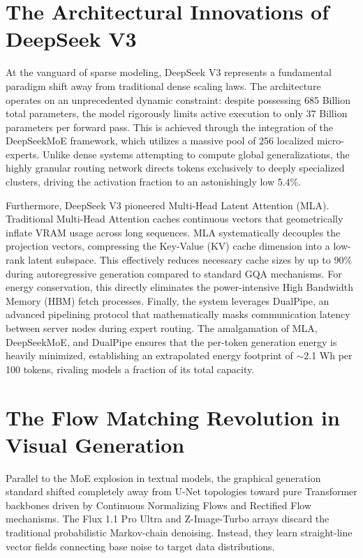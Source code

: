 \documentclass[12pt, a4paper]{report}
\begin{document}
\section{The Architectural Innovations of DeepSeek V3}
At the vanguard of sparse modeling, DeepSeek V3 represents a fundamental paradigm shift away from traditional dense scaling laws. The architecture operates on an unprecedented dynamic constraint: despite possessing 685 Billion total parameters, the model rigorously limits active execution to only 37 Billion parameters per forward pass. This is achieved through the integration of the DeepSeekMoE framework, which utilizes a massive pool of 256 localized micro-experts. Unlike dense systems attempting to compute global generalizations, the highly granular routing network directs tokens exclusively to deeply specialized clusters, driving the activation fraction to an astonishingly low 5.4\%.

Furthermore, DeepSeek V3 pioneered Multi-Head Latent Attention (MLA). Traditional Multi-Head Attention caches continuous vectors that geometrically inflate VRAM usage across long sequences. MLA systematically decouples the projection vectors, compressing the Key-Value (KV) cache dimension into a low-rank latent subspace. This effectively reduces necessary cache sizes by up to 90\% during autoregressive generation compared to standard GQA mechanisms. For energy conservation, this directly eliminates the power-intensive High Bandwidth Memory (HBM) fetch processes. Finally, the system leverages DualPipe, an advanced pipelining protocol that mathematically masks communication latency between server nodes during expert routing. The amalgamation of MLA, DeepSeekMoE, and DualPipe ensures that the per-token generation energy is heavily minimized, establishing an extrapolated energy footprint of $\sim$2.1 Wh per 100 tokens, rivaling models a fraction of its total capacity.

\section{The Flow Matching Revolution in Visual Generation}
Parallel to the MoE explosion in textual models, the graphical generation standard shifted completely away from U-Net topologies toward pure Transformer backbones driven by Continuous Normalizing Flows and Rectified Flow mechanisms. The Flux 1.1 Pro Ultra and Z-Image-Turbo arrays discard the traditional probabilistic Markov-chain denoising. Instead, they learn straight-line vector fields connecting base noise to target data distributions. 
\end{document}
